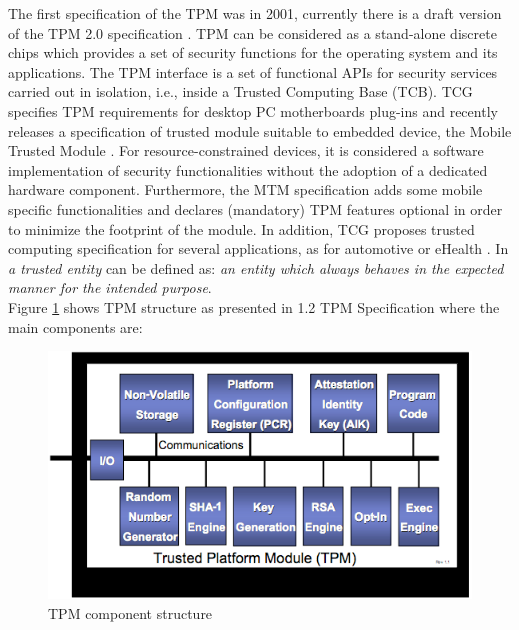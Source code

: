 \documentclass[../tesi.tex]{subfiles}
\begin{document}
The first specification of the TPM was in 2001, currently there is a draft version of the TPM 2.0 specification \cite{tcg2014_2.0}. 
TPM can be considered as a stand-alone discrete chips which provides a set of security
functions for the operating system and its applications. The TPM interface is a set of functional APIs for security services carried out in isolation, i.e., inside
a Trusted Computing Base (TCB).
TCG specifies TPM requirements for desktop PC motherboards plug-ins and recently releases a specification of trusted module suitable to embedded device, the Mobile Trusted Module \cite{tcg_mobile_1.0}. For resource-constrained devices, it is considered a software implementation of security functionalities without the adoption of a dedicated hardware component. Furthermore, the MTM specification adds some mobile specific functionalities and declares (mandatory) TPM features optional in order to minimize the footprint of the module.
In addition,  TCG proposes trusted computing specification for several applications, as for automotive \cite{tcg2015automotive} or eHealth  \cite{grossmann2007security}.
In \cite{pearson2003trusted} \emph{a trusted entity} can be defined as: \textit{an entity which always behaves in the expected manner for the intended purpose}. \\
Figure \ref{fig:tpmstructure} shows TPM structure as presented in 1.2 TPM Specification \cite{tcg2011main} where the main components are:
\begin{figure}
\centering
\includegraphics[scale=0.55]{images/tpmv14.png}
\caption{TPM component structure}
\label{fig:tpmstructure}
\end{figure}
\end{document}
